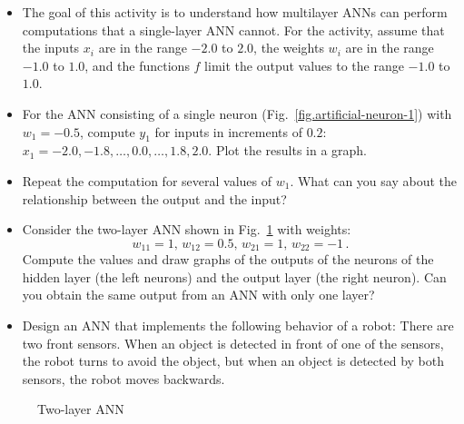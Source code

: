 \begin{framed}
\begin{itemize}
\item The goal of this activity is to understand how multilayer ANNs can perform computations that a single-layer ANN cannot. For the activity, assume that the inputs $x_i$ are in the range $-2.0$ to $2.0$, the weights $w_i$ are in the range $-1.0$ to $1.0$, and the functions $f$ limit the output values to the range $-1.0$ to $1.0$.
\item For the ANN consisting of a single neuron (Fig.~\ref{fig.artificial-neuron-1}) with $w_1=-0.5$, compute $y_1$ for inputs in increments of $0.2$: $x_1=-2.0, -1.8, \ldots, 0.0, \ldots, 1.8, 2.0$. Plot the results in a graph.
\item Repeat the computation for several values of $w_1$. What can you say about the relationship between the output and the input?
\item Consider the two-layer ANN shown in Fig.~\ref{fig.two-layer-ann} with weights:
\[
 w_{11}=1,\, w_{12}=0.5,\, w_{21}=1,\, w_{22}=-1\,. 
\]
Compute the values and draw graphs of the outputs of the neurons of the hidden layer (the left neurons) and the output layer (the right neuron). Can you obtain the same output from an ANN with only one layer?
\end{itemize}
\end{framed}
\begin{framed}

\begin{itemize}
\item Design an ANN that implements the following behavior of a robot: There are two front sensors. When an object is detected in front of one of the sensors, the robot turns to avoid the object, but when an object is detected by both sensors, the robot moves backwards.
\end{itemize}
\end{framed}

\begin{figure}
\begin{center}
\caption{Two-layer ANN}\label{fig.two-layer-ann}
\end{center}
\end{figure}

